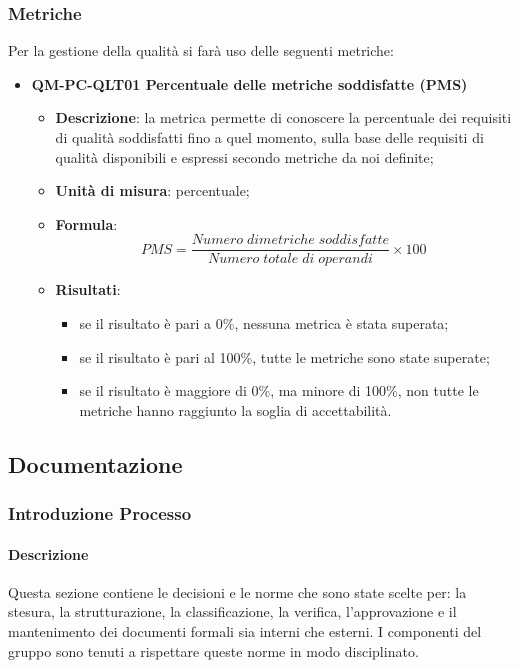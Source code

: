         \subsubsection{Metriche}
            Per la gestione della qualità si farà uso delle seguenti metriche:
            \begin{itemize}
                \item\textbf{QM-PC-QLT01 Percentuale delle metriche soddisfatte (PMS)}
                    \begin{itemize}
                        \item\textbf{Descrizione}: la metrica permette di conoscere la percentuale dei requisiti di qualità soddisfatti fino a quel momento, sulla base delle requisiti di qualità disponibili e espressi secondo metriche da noi definite;
                        \item\textbf{Unità di misura}: percentuale;
                        \item\textbf{Formula}: \\
                            \[PMS = \frac{\mathit{Numero\;di metriche\;soddisfatte}}{\mathit{Numero\;totale\;di\;operandi}} \times 100\]
                        \item\textbf{Risultati}: 
                            \begin{itemize}
                                \item se il risultato è pari a 0\%, nessuna metrica è stata superata;
                                \item se il risultato è pari al 100\%, tutte le metriche sono state superate;
                                \item se il risultato è maggiore di 0\%, ma minore di 100\%, non tutte le metriche hanno raggiunto la soglia di accettabilità.
                            \end{itemize}
                    \end{itemize}
            \end{itemize}
    
    \subsection{Documentazione}
        \subsubsection{Introduzione Processo}
            \paragraph{Descrizione}
                Questa sezione contiene le decisioni e le norme che sono state scelte per: la stesura, la strutturazione, la classificazione, la verifica, l’approvazione e il mantenimento dei documenti formali sia interni che esterni. I componenti del gruppo sono tenuti a rispettare queste norme in modo disciplinato.
